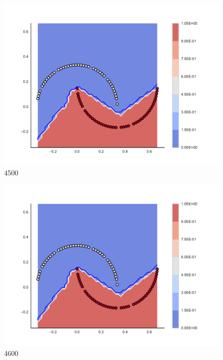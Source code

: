 \begin{subfigure}[b]{0.09\textwidth}
    \includegraphics[clip, trim=2.35cm 1.75cm 4.5cm 0cm,width=\textwidth]{img/convergence/4500.pdf}
    \caption{4500}
    \label{fig:convergence_4500}
\end{subfigure}
%
\begin{subfigure}[b]{0.09\textwidth}
    \includegraphics[clip, trim=2.35cm 1.75cm 4.5cm 0cm,width=\textwidth]{img/convergence/4600.pdf}
    \caption{4600}
    \label{fig:convergence_4600}
\end{subfigure}
%
